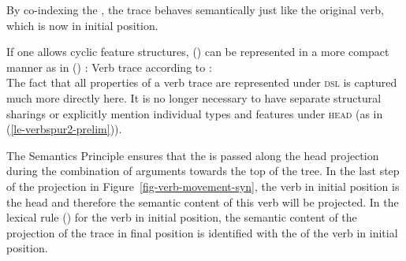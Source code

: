By co-indexing the \contvs, the trace behaves semantically just like the original verb, which is
now in initial position.

If one allows cyclic feature structures, () can be represented in a more compact manner
as in () \citep[]{Meurers2000b}:  
\eas
\label{le-verbspur2}
Verb trace according to :\\
\zs
The fact that all \local properties of a verb trace are represented under \textsc{dsl} is captured much
more directly here. It is no longer necessary to have separate structural sharings or explicitly mention individual types and features
under \textsc{head} (as in (\ref{le-verbspur2-prelim})).

The Semantics Principle ensures that the \contv is passed along the head projection during the combination of arguments towards the top of the tree. 
In the last step of the projection in Figure~\ref{fig-verb-movement-syn}, the verb in initial position is the head and therefore the semantic
content of this verb will be projected. In the lexical rule () for the verb in initial position, 
the semantic content of the projection of the trace in final position  is identified with the 
\contv of the verb in initial position.


